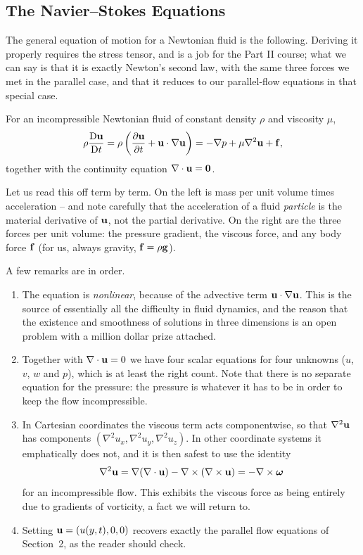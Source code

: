 \documentclass[a4paper]{scrartcl}
\newcommand{\D}{\mathrm{D}}
\newcommand{\Dt}[1]{\frac{\D #1}{\D t}}
\newcommand{\pd}[2]{\frac{\partial #1}{\partial #2}}
\newcommand{\bom}{\boldsymbol{\omega}}
\begin{document}
\subsection{The Navier--Stokes Equations}

The general equation of motion for a Newtonian fluid is the following. Deriving it properly requires the stress tensor, and is a job for the Part II course; what we can say is that it is exactly Newton's second law, with the same three forces we met in the parallel case, and that it reduces to our parallel-flow equations in that special case.

\begin{law}
	For an incompressible Newtonian fluid of constant density $\rho$ and viscosity $\mu$,
	$$
	\rho \Dt{\vv u} = \rho\left(\pd{\vv u}{t} + \vv u \cdot \nabla \vv u\right) = -\nabla p + \mu \nabla^2 \vv u + \vv f,
	$$
	together with the continuity equation $\nabla \cdot \mathbf{u} = \mathbf{0}$.
\end{law}

Let us read this off term by term. On the left is mass per unit volume times acceleration -- and note carefully that the acceleration of a fluid \emph{particle} is the material derivative of $\mathbf{u}$, not the partial derivative. On the right are the three forces per unit volume: the pressure gradient, the viscous force, and any body force $\mathbf{f}$ (for us, always gravity, $\mathbf{f} = \rho \mathbf{g}$).

A few remarks are in order.

\begin{enumerate}[label=(\roman*)]
	\item The equation is \emph{nonlinear}, because of the advective term $\mathbf{u} \cdot \nabla \mathbf{u}$. This is the source of essentially all the difficulty in fluid dynamics, and the reason that the existence and smoothness of solutions in three dimensions is an open problem with a million dollar prize attached.
	\item Together with $\nabla \cdot \mathbf{u} = 0$ we have four scalar equations for four unknowns ($u$, $v$, $w$ and $p$), which is at least the right count. Note that there is no separate equation for the pressure: the pressure is whatever it has to be in order to keep the flow incompressible.
	\item In Cartesian coordinates the viscous term acts componentwise, so that $\nabla^2 \mathbf{u}$ has components $(\nabla^2 u_x, \nabla^2 u_y, \nabla^2 u_z)$. In other coordinate systems it emphatically does not, and it is then safest to use the identity
	$$
	\nabla^2 \vv u = \nabla(\nabla \cdot \vv u) - \nabla \times (\nabla \times \vv u) = -\nabla \times \bom
	$$
	for an incompressible flow. This exhibits the viscous force as being entirely due to gradients of vorticity, a fact we will return to.
	\item Setting $\mathbf{u} = (u(y, t), 0, 0)$ recovers exactly the parallel flow equations of Section~2, as the reader should check.
\end{enumerate}
\end{document}
